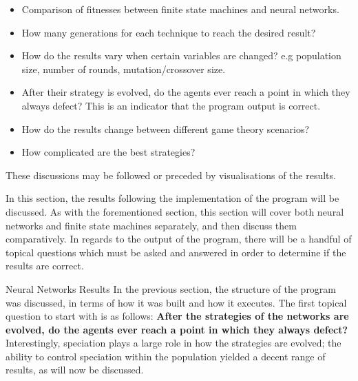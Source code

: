\documentclass[12pt,a4paper]{article}
\makeatletter
\renewcommand\subsection{\@startsection {subsection}{1}{2mm}
                               {3pt plus 2pt minus 1pt}
                               {3pt plus 0pt}
                               {\normalfont\bfseries}}
\makeatother
\begin{document}
\begin{itemize}
  \item Comparison of fitnesses between finite state machines and neural networks.
  \item How many generations for each technique to reach the desired result?
  \item How do the results vary when certain variables are changed? e.g population size, number of rounds, mutation/crossover size.
  \item After their strategy is evolved, do the agents ever reach a point in which they always defect? This is an indicator that the program output is correct.
  \item How do the results change between different game theory scenarios?
  \item How complicated are the best strategies?
\end{itemize}

These discussions may be followed or preceded by visualisations of the results.
\fi

In this section, the results following the implementation of the program will be discussed. As with the forementioned section, this section will cover both neural networks and finite state machines separately, and then discuss them comparatively. In regards to the output of the program, there will be a handful of topical questions which must be asked and answered in order to determine if the results are correct.

\subsection{Neural Networks Results}
In the previous section, the structure of the program was discussed, in terms of how it was built and how it executes. The first topical question to start with is as follows: \textbf{After the strategies of the networks are evolved, do the agents ever reach a point in which they always defect?} Interestingly, speciation plays a large role in how the strategies are evolved; the ability to control speciation within the population yielded a decent range of results, as will now be discussed.
\end{document}

